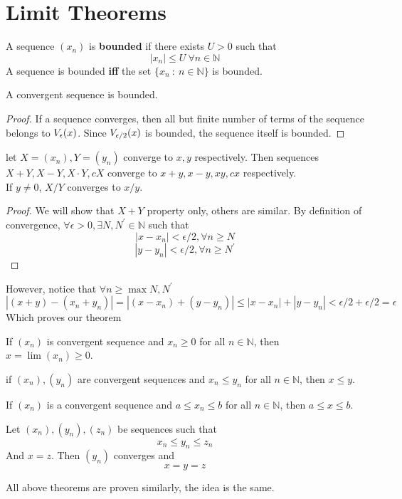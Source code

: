 \section{Limit Theorems}
\begin{definition} A sequence $(x_n)$ is \textbf{bounded} if there exists $U > 0$ such that
    \[ |x_n| \le U \ \forall n \in \mathbb{N}\]
    A sequence is bounded \textbf{iff} the set $\{ x_n \ : \ n \in \mathbb{N}\}$ is bounded.
\end{definition}
\begin{theorem} A convergent sequence is bounded.
    \begin{proof}
        If a sequence converges, then all but finite number of terms of the sequence belongs to $V_{\epsilon}(x)$. Since $V_{\epsilon/2}(x)$ is bounded, the sequence itself is bounded.
    \end{proof}
\end{theorem}
\begin{theorem} let $X= (x_n),Y =(y_n)$ converge to $x,y$ respectively. Then sequences $X+Y,X-Y,X \cdot Y, cX$ converge to $x+y, x-y, xy, cx$ respectively.\\
    If $y \neq 0$, $X/Y$ converges to $x/y$. \\
    \begin{proof}
        We will show that $X+Y$ property only, others are similar.
        By definition of convergence, $\forall \epsilon > 0, \exists N,N^{'} \in \mathbb{N}$ such that 
        \[|x - x_n| < \epsilon /2, \forall n \ge N\]
        \[|y - y_n| < \epsilon / 2, \forall n \ge N^{'}\]
    \end{proof}
    However, notice that $\forall n \ge \max N,N^{'}$
    \[|(x+y) - (x_n+y_n)| = |(x - x_n)+ (y-y_n)| \le |x - x_n| + |y- y_n| < \epsilon/2 + \epsilon/2 = \epsilon\]
    Which proves our theorem
\end{theorem}

\begin{theorem}
    If $(x_n)$ is convergent sequence and $x_n \ge 0$ for all $n \in \mathbb{N}$, then $x = \lim(x_n) \ge 0$.
\end{theorem}
\begin{theorem}
    if $(x_n),(y_n)$ are convergent sequences and $x_n \le y_n$ for all $n \in \mathbb{N}$, then $x \le y$.
\end{theorem}
\begin{theorem}
If $(x_n)$ is a convergent sequence and $a \le x_n \le b$ for all $n \in \mathbb{N}$, then $a \le x \le b$.
\end{theorem}
\begin{theorem}
    Let $(x_n),(y_n),(z_n)$ be sequences such that
    \[ x_n \le y_n \le z_n\]
    And $x = z$. Then $(y_n)$ converges and
    \[ x = y = z\]
\end{theorem}
All above theorems are proven similarly, the idea is the same.
